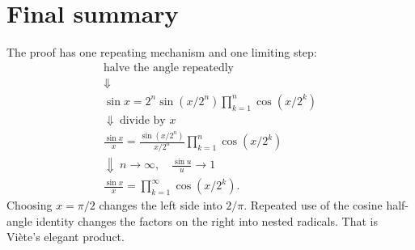 \documentclass[11pt]{article}
\begin{document}
\section{Final summary}

The proof has one repeating mechanism and one limiting step:
\[
\boxed{
\begin{array}{c}
\text{halve the angle repeatedly}\\[0.2em]
\Downarrow\\[0.2em]
\sin x=2^n\sin(x/2^n)
\displaystyle\prod_{k=1}^{n}\cos(x/2^k)\\[0.4em]
\Downarrow\ \text{divide by }x\\[0.2em]
\displaystyle
\frac{\sin x}{x}
=\frac{\sin(x/2^n)}{x/2^n}
\prod_{k=1}^{n}\cos(x/2^k)\\[0.4em]
\Downarrow\ n\to\infty,
\quad \frac{\sin u}{u}\to1\\[0.2em]
\displaystyle
\frac{\sin x}{x}
=\prod_{k=1}^{\infty}\cos(x/2^k).
\end{array}}
\]
Choosing \(x=\pi/2\) changes the left side into \(2/\pi\). Repeated use of the cosine half-angle identity changes the factors on the right into nested radicals. That is Vi\`ete's elegant product.
\end{document}
